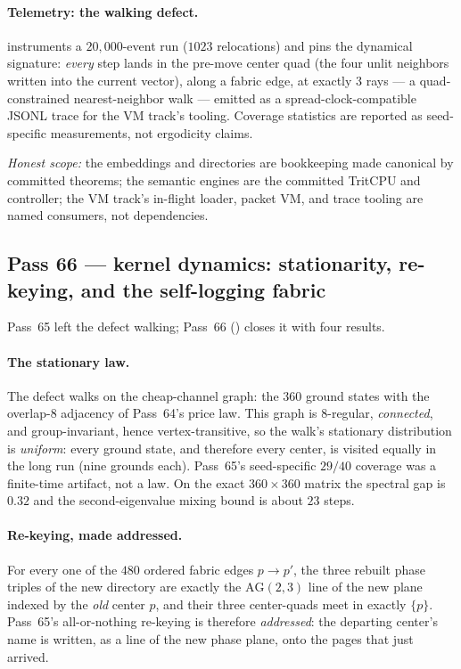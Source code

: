 \documentclass[11pt]{article}
\begin{document}
\paragraph{Telemetry: the walking defect.}
 instruments a \(20{,}000\)-event
run (\(1023\) relocations) and pins the dynamical signature: \emph{every} step
lands in the pre-move center quad (the four unlit neighbors written into the
current vector), along a fabric edge, at exactly \(3\) rays --- a
quad-constrained nearest-neighbor walk --- emitted as a
spread-clock-compatible JSONL trace for the VM track's tooling.  Coverage
statistics are reported as seed-specific measurements, not ergodicity claims.

\emph{Honest scope:} the embeddings and directories are bookkeeping made
canonical by committed theorems; the semantic engines are the committed
TritCPU and controller; the VM track's in-flight loader, packet VM, and trace
tooling are named consumers, not dependencies.

\subsection{Pass 66 --- kernel dynamics: stationarity, re-keying, and the self-logging fabric}
\label{sec:capstone-sixtysix}

Pass~65 left the defect walking; Pass~66
() closes it with four results.

\paragraph{The stationary law.}  The defect walks on the cheap-channel graph:
the \(360\) ground states with the overlap-\(8\) adjacency of Pass~64's price
law.  This graph is \(8\)-regular, \emph{connected}, and group-invariant, hence
vertex-transitive, so the walk's stationary distribution is \emph{uniform}:
every ground state, and therefore every center, is visited equally in the long
run (nine grounds each).  Pass~65's seed-specific \(29/40\) coverage was a
finite-time artifact, not a law.  On the exact \(360\times360\) matrix the
spectral gap is \(0.32\) and the second-eigenvalue mixing bound is about
\(23\) steps.

\paragraph{Re-keying, made addressed.}  For every one of the \(480\) ordered
fabric edges \(p\to p'\), the three rebuilt phase triples of the new directory
are exactly the \(\mathrm{AG}(2,3)\) line of the new plane indexed by the
\emph{old} center \(p\), and their three center-quads meet in exactly
\(\{p\}\).  Pass~65's all-or-nothing re-keying is therefore \emph{addressed}:
the departing center's name is written, as a line of the new phase plane, onto
the pages that just arrived.
\end{document}

